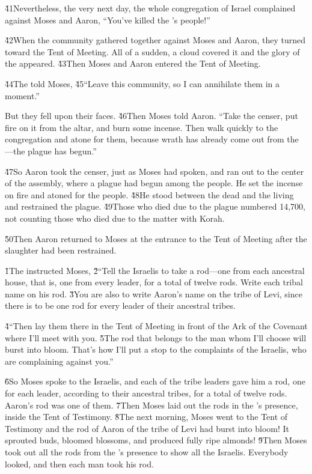 \v{41}Nevertheless, the very next day, the whole congregation of Israel complained against Moses and Aaron, ``You've killed the 's people!''

\v{42}When the community gathered together against Moses and Aaron, they turned toward the Tent of Meeting. All of a sudden, a cloud covered it and the glory of the  appeared. \v{43}Then Moses and Aaron entered the Tent of Meeting.

\v{44}The  told Moses, \v{45}``Leave this community, so I can annihilate them in a moment.''

But they fell upon their faces. \v{46}Then Moses told Aaron. ``Take the censer, put fire on it from the altar, and burn some incense. Then walk quickly to the congregation and atone for them, because wrath has already come out from the ---the plague has begun.''

\v{47}So Aaron took the censer, just as Moses had spoken, and ran out to the center of the assembly, where a plague had begun among the people. He set the incense on fire and atoned for the people. \v{48}He stood between the dead and the living and restrained the plague. \v{49}Those who died due to the plague numbered 14,700, not counting those who died due to the matter with Korah.

\v{50}Then Aaron returned to Moses at the entrance to the Tent of Meeting after the slaughter had been restrained.

\v{1}The  instructed Moses, \v{2}``Tell the Israelis to take a rod---one from each ancestral house, that is, one from every leader, for a total of twelve rods. Write each tribal name on his rod. \v{3}You are also to write Aaron's name on the tribe of Levi, since there is to be one rod for every leader of their ancestral tribes.

\v{4}``Then lay them there in the Tent of Meeting in front of the Ark of the Covenant where I'll meet with you. \v{5}The rod that belongs to the man whom I'll choose will burst into bloom. That's how I'll put a stop to the complaints of the Israelis, who are complaining against you.''

\v{6}So Moses spoke to the Israelis, and each of the tribe leaders gave him a rod, one for each leader, according to their ancestral tribes, for a total of twelve rods. Aaron's rod was one of them. \v{7}Then Moses laid out the rods in the 's presence, inside the Tent of Testimony. \v{8}The next morning, Moses went to the Tent of Testimony and the rod of Aaron of the tribe of Levi had burst into bloom! It sprouted buds, bloomed blossoms, and produced fully ripe almonds! \v{9}Then Moses took out all the rods from the 's presence to show all the Israelis. Everybody looked, and then each man took his rod.

